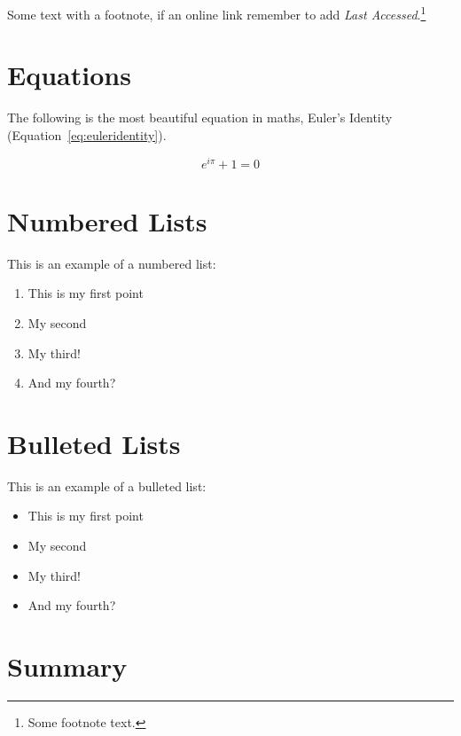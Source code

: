 Some text with a footnote, if an online link remember to add \textit{Last Accessed}.\footnote{Some footnote text.}

\section{Equations}

The following is the most beautiful equation in maths, Euler's Identity (Equation~\ref{eq:euleridentity}).

\begin{equation}\label{eq:euleridentity}
	e^{i\pi}+1=0
\end{equation}

\blindtext

\section{Numbered Lists}

This is an example of a numbered list:

\begin{enumerate}
	\item This is my first point
	\item My second
	\item My third!
	\item And my fourth?
\end{enumerate}

\blindtext

\section{Bulleted Lists}

This is an example of a bulleted list:

\begin{itemize}
	\item This is my first point
	\item My second
	\item My third!
	\item And my fourth?
\end{itemize}



\section{Summary}
\blindtext